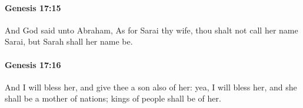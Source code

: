 		\paragraph{Genesis 17:15} %
			\label{GENESIS-17-15}

			And God said unto Abraham, As for Sarai thy wife, thou shalt not call her name Sarai, but Sarah shall her name be.


		\paragraph{Genesis 17:16} %
			\label{GENESIS-17-16}

			And I will bless her, and give thee a son also of her: yea, I will bless her, and she shall be a mother of nations; kings of people shall be of her.


